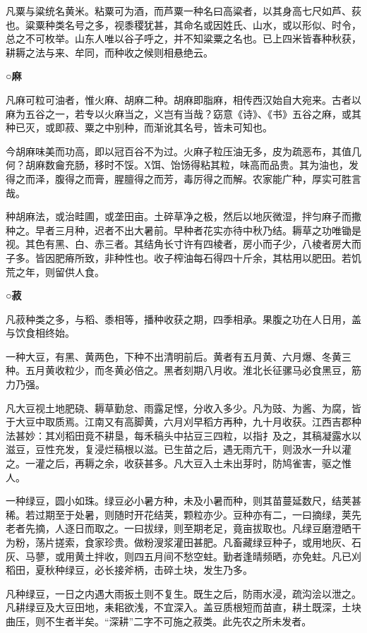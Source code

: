 \documentclass[]{article}
\begin{document}
凡粟与粱统名黄米。粘粟可为酒，而芦粟一种名曰高粱者，以其身高七尺如芦、荻也。粱粟种类名号之多，视黍稷犹甚，其命名或因姓氏、山水，或以形似、时令，总之不可枚举。山东人唯以谷子呼之，并不知粱粟之名也。已上四米皆春种秋获，耕耨之法与来、牟同，而种收之候则相悬绝云。

\textbf{○麻}

凡麻可粒可油者，惟火麻、胡麻二种。胡麻即脂麻，相传西汉始自大宛来。古者以麻为五谷之一，若专以火麻当之，义岂有当哉？窈意《诗》、《书》五谷之麻，或其种已灭，或即菽、粟之中别种，而渐讹其名号，皆未可知也。

今胡麻味美而功高，即以冠百谷不为过。火麻子粒压油无多，皮为疏恶布，其值几何？胡麻数龠充肠，移时不馁。Х饵、饴饧得粘其粒，味高而品贵。其为油也，发得之而泽，腹得之而膏，腥膻得之而芳，毒厉得之而解。农家能广种，厚实可胜言哉。

种胡麻法，或治畦圃，或垄田亩。土碎草净之极，然后以地灰微湿，拌匀麻子而撒种之。早者三月种，迟者不出大暑前。早种者花实亦待中秋乃结。耨草之功唯锄是视。其色有黑、白、赤三者。其结角长寸许有四棱者，房小而子少，八棱者房大而子多。皆因肥瘠所致，非种性也。收子榨油每石得四十斤余，其枯用以肥田。若饥荒之年，则留供人食。

\textbf{○菽}

凡菽种类之多，与稻、黍相等，播种收获之期，四季相承。果腹之功在人日用，盖与饮食相终始。

一种大豆，有黑、黄两色，下种不出清明前后。黄者有五月黄、六月爆、冬黄三种。五月黄收粒少，而冬黄必倍之。黑者刻期八月收。淮北长征骡马必食黑豆，筋力乃强。

凡大豆视土地肥硗、耨草勤怠、雨露足悭，分收入多少。凡为豉、为酱、为腐，皆于大豆中取质焉。江南又有高脚黄，六月刈早稻方再种，九十月收获。江西吉郡种法甚妙：其刈稻田竟不耕垦，每禾稿头中拈豆三四粒，以指扌及之，其稿凝露水以滋豆，豆性充发，复浸烂稿根以滋。已生苗之后，遇无雨亢干，则汲水一升以灌之。一灌之后，再耨之余，收获甚多。凡大豆入土未出芽时，防鸠雀害，驱之惟人。

一种绿豆，圆小如珠。绿豆必小暑方种，未及小暑而种，则其苗蔓延数尺，结荚甚稀。若过期至于处暑，则随时开花结荚，颗粒亦少。豆种亦有二，一曰摘绿，荚先老者先摘，人逐日而取之。一曰拔绿，则至期老足，竟亩拔取也。凡绿豆磨澄晒干为粉，荡片搓索，食家珍贵。做粉溲浆灌田甚肥。凡畜藏绿豆种子，或用地灰、石灰、马蓼，或用黄土拌收，则四五月间不愁空蛀。勤者逢晴频晒，亦免蛀。凡已刈稻田，夏秋种绿豆，必长接斧柄，击碎土块，发生乃多。

凡种绿豆，一日之内遇大雨扳土则不复生。既生之后，防雨水浸，疏沟浍以泄之。凡耕绿豆及大豆田地，耒耜欲浅，不宜深入。盖豆质根短而苗直，耕土既深，土块曲压，则不生者半矣。``深耕''二字不可施之菽类。此先农之所未发者。
\end{document}
